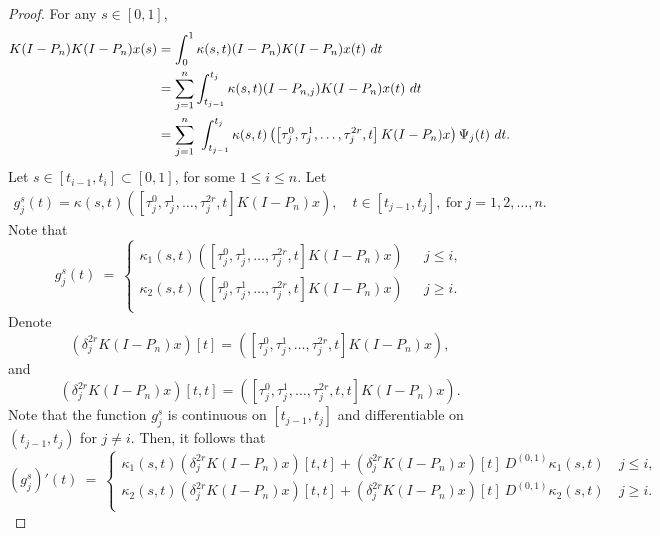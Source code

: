 \documentclass[sn-mathphys-num]{sn-jnl}%
\theoremstyle{thmstyleone}%
\theoremstyle{thmstyletwo}%
\theoremstyle{thmstylethree}%
\begin{document}
\begin{proof}
	For any $s \in [0,1]$, 
	\begin{align} \label{Eq: 23}
		K(I-P_n)K(I-P_n)x(s) &=\int_0^1  \kappa(s,t) (I-P_n)K(I-P_n)x(t) ~dt \notag \\
		&= \sum_{j=1}^{n} \int_{t_{j-1}}^{t_j}  \kappa(s,t) (I-P_{n,j})K(I-P_n)x(t) ~dt  \notag \\
		&= \sum_{j=1}^{n} ~\int_{t_{j-1}}^{t_j}  \kappa(s,t) \left( \left[\tau_j^0,\tau_j^1,\ldots, \tau_j^{2r},t\right]K(I-P_n)x \right) \Psi_j(t) ~dt.
	\end{align}
	Let $s \in [t_{i-1},t_i] \subset [0,1]$, for some $1 \le i \le n$. Let
	\begin{align*}
		g_j^s(t) =  \kappa(s,t) \left( \left[\tau_j^0,\tau_j^1,\ldots, \tau_j^{2r},t\right]K(I-P_n)x \right), \quad t \in [t_{j-1}, t_j], ~ \text{for} ~ j=1,2,\ldots,n.
	\end{align*}
	Note that
	\begin{equation*}
		g_j^s(t) ~= ~
		\begin{cases}
			\kappa_1(s,t) \left( \left[\tau_j^0,\tau_j^1,\ldots, \tau_j^{2r},t\right]K(I-P_n)x \right) ~~~          &  j \le i,\\
			\kappa_2(s,t) \left( \left[\tau_j^0,\tau_j^1,\ldots, \tau_j^{2r},t\right]K(I-P_n)x \right)~~~          & j \ge i.\\
		\end{cases} 
	\end{equation*} 
	Denote
	$$
	\left ( \delta_j^{2r}  K(I-P_n)x \right ) [t] =\left( \left[\tau_j^0,\tau_j^1,\ldots, \tau_j^{2r},t\right]K(I-P_n)x \right),
	$$
	and
	$$
	\left ( \delta_j^{2r}  K(I-P_n)x \right ) [t, t] =\left( \left[\tau_j^0,\tau_j^1,\ldots, \tau_j^{2r},t, t \right]K(I-P_n)x \right).
	$$  
	Note that the function $g_j^s$ is continuous on $[t_{j-1}, t_j]$ and differentiable on $(t_{j-1}, t_j)$ for $j \ne i$. Then, it follows that
	\begin{equation*}
		(g_j^s)'(t) ~=~
		\begin{cases}
			\kappa_1(s,t) \left ( \delta_j^{2r}  K(I-P_n)x \right ) [t, t] + \left ( \delta_j^{2r}  K(I-P_n)x \right ) [t]~ D^{(0,1)} \kappa_1(s,t) ~         &  j \le i,\\
			\kappa_2(s,t) \left ( \delta_j^{2r}  K(I-P_n)x \right ) [t, t] + \left ( \delta_j^{2r}  K(I-P_n)x \right ) [t]~ D^{(0,1)} \kappa_2(s,t)~         & j \ge i.\\
		\end{cases} 
	\end{equation*} 

\end{proof}
\end{document}

